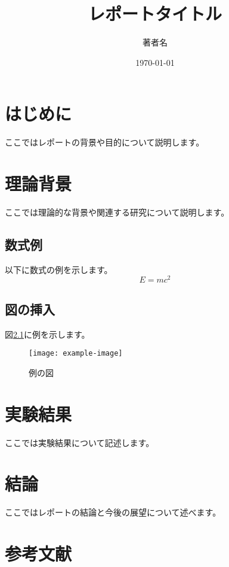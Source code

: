 \documentclass[a4paper,12pt]{report}
\title{レポートタイトル}
\author{著者名}
\date{\today}
\begin{document}
\maketitle

\tableofcontents
\newpage

\chapter{はじめに}
ここではレポートの背景や目的について説明します。

\chapter{理論背景}
ここでは理論的な背景や関連する研究について説明します。

\section{数式例}
以下に数式の例を示します。
\begin{equation}
    E = mc^2
\end{equation}

\section{図の挿入}
図\ref{fig:example}に例を示します。
\begin{figure}[h]
    \centering
    \texttt{[image: example-image]}
    \caption{例の図}
    \label{fig:example}
\end{figure}

\chapter{実験結果}
ここでは実験結果について記述します。

\chapter{結論}
ここではレポートの結論と今後の展望について述べます。

\chapter*{参考文献}


\end{document}

